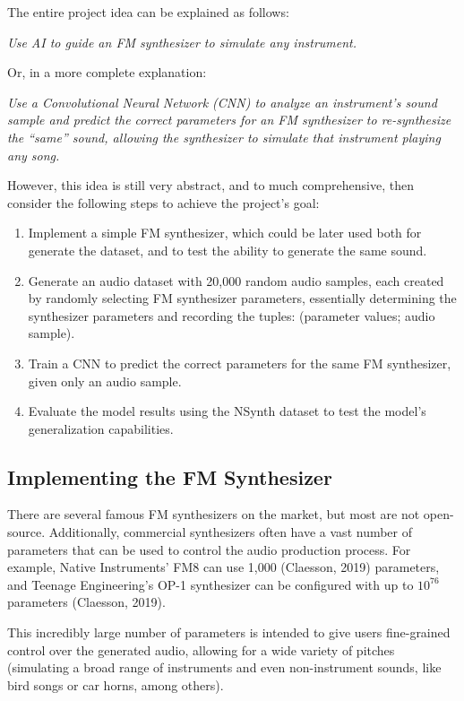 \documentclass[sigconf,natbib=false]{acmart}
\begin{document}
The entire project idea can be explained as follows:

\textit{Use AI to guide an FM synthesizer to simulate any instrument.}

Or, in a more complete explanation:

\textit{Use a Convolutional Neural Network (CNN) to analyze an instrument's sound sample and predict the correct parameters for an FM synthesizer to re-synthesize the ``same'' sound, allowing the synthesizer to simulate that instrument playing any song.}

However, this idea is still very abstract, and to much comprehensive, then consider the following steps to achieve the project's goal:

\begin{enumerate}
\item Implement a simple FM synthesizer, which could be later used both for generate the dataset, and to test the ability to generate the same sound.
\item Generate an audio dataset with 20,000 random audio samples, each created by randomly selecting FM synthesizer parameters, essentially determining the synthesizer parameters and recording the tuples: (parameter values; audio sample).
\item Train a CNN to predict the correct parameters for the same FM synthesizer, given only an audio sample.
\item Evaluate the model results using the NSynth dataset to test the model's generalization capabilities.
\end{enumerate}

\subsection{Implementing the FM Synthesizer}

There are several famous FM synthesizers on the market, but most are not open-source. Additionally, commercial synthesizers often have a vast number of parameters that can be used to control the audio production process. For example, Native Instruments' FM8 can use 1,000 (Claesson, 2019) parameters, and Teenage Engineering’s OP-1 synthesizer can be configured with up to $10^{76}$ parameters (Claesson, 2019).

This incredibly large number of parameters is intended to give users fine-grained control over the generated audio, allowing for a wide variety of pitches (simulating a broad range of instruments and even non-instrument sounds, like bird songs or car horns, among others).
\end{document}
